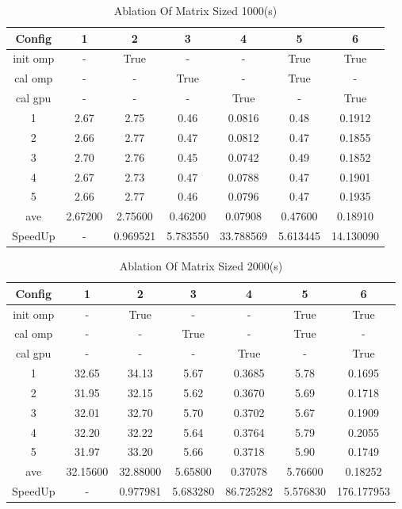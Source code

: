 \documentclass{article}
\begin{document}
\begin{table}[H]
    \centering
    \begin{tabular}{|c|c|c|c|c|c|c|}
        \hline
        Config & 1 & 2 & 3 & 4 & 5 & 6 \\
        \hline
        init omp & - & True & - & - & True & True\\
        \hline
        cal omp & - & - & True & - & True & - \\
        \hline
        cal gpu & - & - & - & True & - & True \\
        \hline
        1 & 2.67 & 2.75 & 0.46 & 0.0816 & 0.48 & 0.1912 \\
        2 & 2.66 & 2.77 & 0.47 & 0.0812 & 0.47 & 0.1855 \\
        3 & 2.70 & 2.76 & 0.45 & 0.0742 & 0.49 & 0.1852 \\
        4 & 2.67 & 2.73 & 0.47 & 0.0788 & 0.47 & 0.1901 \\
        5 & 2.66 & 2.77 & 0.46 & 0.0796 & 0.47 & 0.1935 \\
        \hline
        ave & 2.67200 & 2.75600 & 0.46200 & 0.07908 & 0.47600 & 0.18910\\
        \hline
        SpeedUp & - & 0.969521 & 5.783550 & 33.788569 & 5.613445 & 14.130090 \\
        \hline
    \end{tabular}
    \caption{Ablation Of Matrix Sized 1000(s)}
    \label{tab:1}
\end{table}
\begin{table}[H]
    \centering
    \begin{tabular}{|c|c|c|c|c|c|c|}
        \hline
        Config & 1 & 2 & 3 & 4 & 5 & 6 \\
        \hline
        init omp & - & True & - & - & True & True\\
        \hline
        cal omp & - & - & True & - & True & - \\
        \hline
        cal gpu & - & - & - & True & - & True \\
        \hline
        1 & 32.65 & 34.13 & 5.67 & 0.3685 & 5.78 & 0.1695\\
        2 & 31.95 & 32.15 & 5.62 & 0.3670 & 5.69 & 0.1718\\
        3 & 32.01 & 32.70 & 5.70 & 0.3702 & 5.67 & 0.1909 \\
        4 & 32.20 & 32.22 & 5.64 & 0.3764 & 5.79 & 0.2055 \\
        5 & 31.97 & 33.20 & 5.66 & 0.3718 & 5.90 & 0.1749 \\
        \hline
        ave & 32.15600 & 32.88000 & 5.65800 & 0.37078 & 5.76600 & 0.18252\\
        \hline
        SpeedUp & - & 0.977981 & 5.683280 & 86.725282 & 5.576830 & 176.177953\\
        \hline
    \end{tabular}
    \caption{Ablation Of Matrix Sized 2000(s)}
    \label{tab:2}
\end{table}
\end{document}
